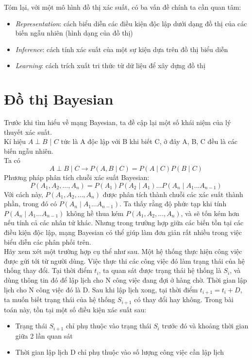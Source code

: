 \documentclass{my_style}
\begin{document}
Tóm lại, với một mô hình đồ thị xác suất, có ba vấn đề chính ta cần quan tâm: 
\begin{itemize}
	\item \textit{Representation}: cách biểu diễn các điều kiện độc lập dưới dạng đồ thị của các biến ngẫu nhiên (hình dạng của đồ thị)
	\item \textit{Inference}: cách tính xác suất của một sự kiện dựa trên đồ thị biểu diễn
	\item \textit{Learning}: cách trích xuất tri thức từ dữ liệu để xây dựng đồ thị
\end{itemize}
\section{Đồ thị Bayesian}
Trước khi tìm hiểu về mạng Bayesian, ta đề cập lại một số khái niệm của lý thuyết xác suất. \\
Kí hiệu $A \perp B$ | $C$ tức là A độc lập với B khi biết C, ở đây A, B, C đều là các biến ngẫu nhiên. \\
Ta có 
\begin{equation}
	A \perp B \mid C \rightarrow P(A,B \mid C) = P(A \mid C)P(B \mid C)
\end{equation}
Phương pháp phân tích chuỗi xác suất Bayesian: 
\begin{equation}
	P(A_{1}, A_{2}, ..., A_{n}) = P(A_{1})P(A_{2} \mid A_{1}) ... P(A_{n} \mid A_{1} ... A_{n-1})
\end{equation}
Với cách này, $P(A_{1}, A_{2}, ..., A_{n})$ được phân tích thành chuỗi các xác suất thành phần, trong đó có $P(A_{n} \mid A_{1} ... A_{n-1})$. Ta thấy rằng độ phức tạp khi tính $P(A_{n} \mid A_{1} ... A_{n-1})$ không hề thua kém $P(A_{1}, A_{2}, ..., A_{n})$, và sẽ tốn kém hơn nếu tính cả các nhân tử khác. Nhưng trong trường hợp giữa các biến tồn tại các điều kiện độc lập, mạng Bayesian có thể giúp làm đơn giản rất nhiều trong việc biểu diễn các phân phối trên.\\
Hãy xem xét một trường hợp cụ thể như sau. Một hệ thống thực hiện công việc được gửi tới từ người dùng. 
Việc thực thi các công việc đó làm trạng thái của hệ thống thay đổi. Tại thời điểm $t_{i}$, ta quan sát được trạng thái hệ thống là $S_{i}$, và dùng thông tin đó để lập lịch cho N công việc đang đợi ở hàng chờ. Thời gian lập lịch cho N công việc đó là D. Sau khi lập lịch xong, tại thời điểm $t_{i + 1} = t_{i} + D$, ta muốn biết trạng thái của hệ thống $S_{i+1}$ có thay đổi hay không. Trong bài toán này, tồn tại một số điều kiện xác suất sau: 
\begin{itemize}
	\item Trạng thái $S_{i+1}$ chỉ phụ thuộc vào trạng thái $S_{i}$ trước đó và khoảng thời gian giữa 2 lần quan sát 
	\item Thời gian lập lịch D chỉ phụ thuộc vào số lượng công việc cần lập lịch 
\end{itemize}
 
\end{document}
